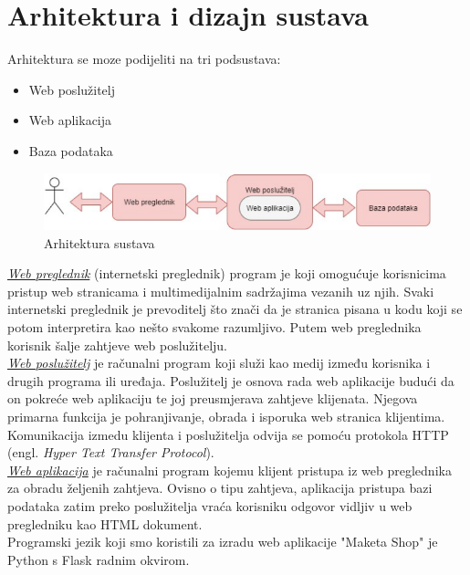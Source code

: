 \chapter{Arhitektura i dizajn sustava}
		\noindent Arhitektura se moze podijeliti na tri podsustava: 
		\begin{itemize}
			\item Web poslužitelj
			\item Web aplikacija
			\item Baza podataka
		\end{itemize}
	
		\begin{figure}[H]
			\includegraphics[width=.9\linewidth]{slike/arhitektura_sustava.png}
			\centering
			\caption{Arhitektura sustava}
			\label{fig:arh1}
		\end{figure}

		\indent \underline{\textit{Web preglednik}} (internetski preglednik) program je koji omogućuje korisnicima pristup web stranicama i multimedijalnim sadržajima vezanih uz njih. Svaki internetski preglednik je prevoditelj što znači da je stranica pisana u kodu koji se potom interpretira kao nešto svakome razumljivo. Putem web preglednika korisnik šalje zahtjeve web poslužitelju. \\
		\indent \underline{\textit{Web poslužitelj}} je računalni program koji služi kao medij između korisnika i drugih programa ili uređaja. Poslužitelj je osnova rada web aplikacije budući da on pokreće web aplikaciju te joj preusmjerava zahtjeve klijenata. Njegova primarna funkcija je pohranjivanje, obrada i isporuka web stranica klijentima. Komunikacija izmedu klijenta i poslužitelja odvija se pomoću protokola HTTP (engl. \textit{Hyper Text Transfer Protocol}).\\
		\indent \underline{\textit{Web aplikacija}} je računalni program kojemu klijent pristupa iz web preglednika za obradu željenih zahtjeva. Ovisno o tipu zahtjeva, aplikacija pristupa bazi podataka zatim preko poslužitelja vraća korisniku odgovor vidljiv u web pregledniku kao HTML dokument.\\
		
		Programski jezik koji smo koristili za izradu web aplikacije "Maketa Shop" je Python s Flask radnim okvirom.\\
		
